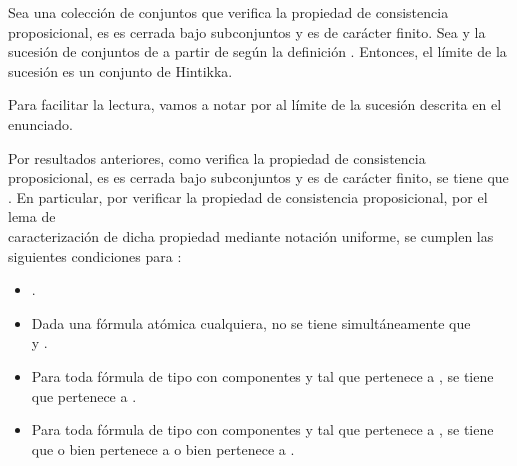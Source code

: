 \begin{isabellebody}
\begin{isamarkuptext}
  \begin{lema}
    Sea  una colección de conjuntos que verifica la propiedad de consistencia proposicional, es
    es cerrada bajo subconjuntos y es de carácter finito. Sea  y  la sucesión de
    conjuntos de  a partir de  según la definición . Entonces, el límite de la sucesión
     es un conjunto de Hintikka.
  \end{lema}

  \begin{demostracion}
    Para facilitar la lectura, vamos a notar por  al límite de la sucesión  descrita 
    en el enunciado.

    Por resultados anteriores, como  verifica la propiedad de consistencia proposicional, es
    es cerrada bajo subconjuntos y es de carácter finito, se tiene que . En particular, por 
    verificar la propiedad de consistencia proposicional, por el lema de\\ caracterización de dicha
    propiedad mediante notación uniforme, se cumplen las siguientes condiciones para :

    \begin{itemize}
      \item {}.
      \item Dada  una fórmula atómica cualquiera, no se tiene 
      simultáneamente que\\  y .
      \item Para toda fórmula de tipo \isa{{\isasymalpha}} con componentes  y  tal que \isa{{\isasymalpha}}
      pertenece a , se tiene que  pertenece a .
      \item Para toda fórmula de tipo \isa{{\isasymbeta}} con componentes  y  tal que \isa{{\isasymbeta}}
      pertenece a , se tiene que o bien  pertenece a  o 
      bien  pertenece a .
    \end{itemize}


\end{demostracion}
\end{isamarkuptext}
\end{isabellebody}
